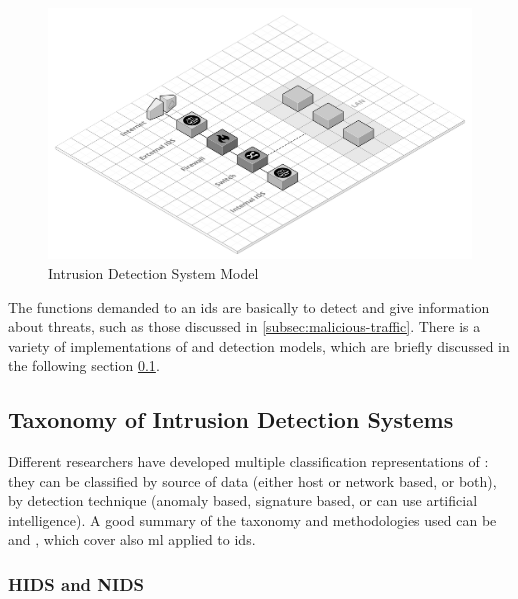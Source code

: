 \begin{figure}[h!]
        \centering
        \includegraphics[scale=0.2]{assets/figures/chapter2/Intrusion Detection System Model.png}
        \caption{Intrusion Detection System Model}
        \label{fig:IDS-model}
\end{figure}
\noindent The functions demanded to an \gls{ids} are basically to detect and give information about threats, such as those discussed in \ref{subsec:malicious-traffic}. There is a variety of implementations of  and detection models, which are briefly discussed in the following section \ref{subsec:taxonomy-ids}.



\subsection{Taxonomy of Intrusion Detection Systems}
\label{subsec:taxonomy-ids}

Different researchers have developed multiple classification representations of : they can be classified by source of data (either host or network based, or both), by detection technique (anomaly based, signature based, or can use artificial intelligence). A good summary of the taxonomy and methodologies used can be \cite{Hodo2017} and \cite{Liu2019}, which cover also \gls{ml} applied to \gls{ids}.


\subsubsection{HIDS and NIDS}
\label{subsubsec:hids-nids}

